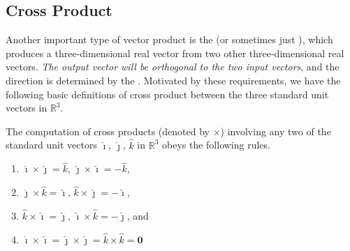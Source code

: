 \subsection{Cross Product}
\label{section:crossprod}
Another important type of vector product is the  (or sometimes just ), which produces a three-dimensional real vector from two other three-dimensional real vectors. \textit{The output vector will be orthogonal to the two input vectors}, and the direction is determined by the . Motivated by these requirements, we have the following basic definitions of cross product between the three standard unit vectors in $\mathbb{R}^3$.
\begin{defn}
\label{defn:crossijk}
The computation of cross products (denoted by $\times$) involving any two of the standard unit vectors $\hat{\imath}$, $\hat{\jmath}$, $\hat{k}$ in $\mathbb{R}^3$ obeys the following rules.
\begin{enumerate}
\item $\hat{\imath} \times \hat{\jmath} = \hat{k}$, $\hat{\jmath} \times \hat{\imath} = -\hat{k}$,
\item $\hat{\jmath} \times \hat{k} = \hat{\imath}$, $\hat{k} \times \hat{\jmath} = -\hat{\imath}$,
\item $\hat{k} \times \hat{\imath} = \hat{\jmath}$, $\hat{\imath} \times \hat{k} = -\hat{\jmath}$, and
\item $\hat{\imath} \times \hat{\imath} = \hat{\jmath} \times \hat{\jmath} = \hat{k} \times \hat{k} = \textbf{0}$
\end{enumerate}
\end{defn}
